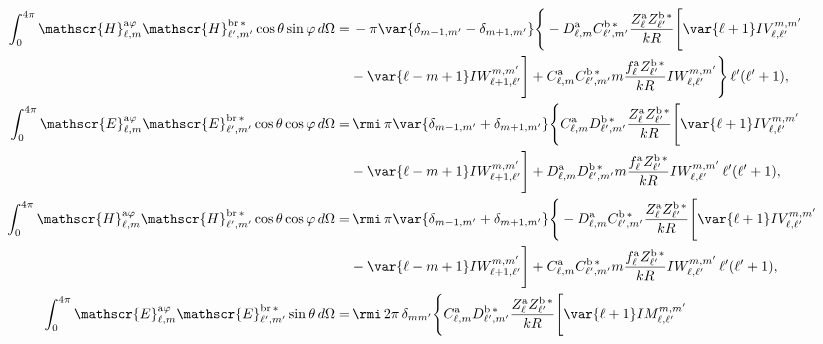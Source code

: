 \begin{align} 
\int_0^{4\pi}\mathscr{H}_{\ell, m}^{\text{a}\varphi}\mathscr{H}_{\ell^{\prime}, m^{\prime}}^{\text{br}\,*}\cos\theta\sin\varphi \, d\Omega
%
 =& \, - \pi \var{ \delta_{m-1, m^{\prime}} - \delta_{m+1, m^{\prime}} } \Bigg\{ -D_{\ell, m}^{\rm a} C_{\ell^{\prime}, m^{\prime}}^{\rm b \, *} \frac{Z_{\ell}^{\rm a} Z_{\ell^{\prime}}^{\rm b \, *}}{k R} \Bigg[\var{\ell +1} IV_{\ell, \ell^{\prime}}^{m, m^{\prime}} \nonumber \\ 
% 
&-\var{\ell - m +1} IW_{\ell + 1, \ell^{\prime}}^{m, m^{\prime}} \Bigg]
%
 + C_{\ell, m}^{\rm a} C_{\ell^{\prime}, m^{\prime}}^{\rm b \, *} m \frac{f_{\ell}^{\rm a} Z_{\ell^{\prime}}^{\rm b\, *}}{k R} IW_{\ell, \ell^{\prime}}^{m, m^{\prime}} \Bigg\} \, \ell^{\prime}(\ell^{\prime}+1),  \\
% 
%
%
%
\int_0^{4\pi}\mathscr{E}_{\ell, m}^{\text{a}\varphi}\mathscr{E}_{\ell^{\prime}, m^{\prime}}^{\text{br}\,*}\cos\theta\cos\varphi \, d\Omega
%
 =& \, \rmi \, \pi \var{ \delta_{m-1, m^{\prime}} + \delta_{m+1, m^{\prime}} } \Bigg\{ C_{\ell, m}^{\rm a} D_{\ell^{\prime}, m^{\prime}}^{\rm b \, *} \frac{Z_{\ell}^{\rm a} Z_{\ell^{\prime}}^{\rm b \, *}}{k R} \Bigg[\var{\ell +1} IV_{\ell, \ell^{\prime}}^{m, m^{\prime}} \nonumber \\ 
% 
&-\var{\ell - m +1} IW_{\ell + 1, \ell^{\prime}}^{m, m^{\prime}} \Bigg]
%
 + D_{\ell, m}^{\rm a} D_{\ell^{\prime}, m^{\prime}}^{\rm b \, *} m \frac{f_{\ell}^{\rm a} Z_{\ell^{\prime}}^{\rm b\, *}}{k R} IW_{\ell, \ell^{\prime}}^{m, m^{\prime}} \, \ell^{\prime}(\ell^{\prime}+1),\\
%
%
\int_0^{4\pi}\mathscr{H}_{\ell, m}^{\text{a}\varphi}\mathscr{H}_{\ell^{\prime}, m^{\prime}}^{\text{br}\,*}\cos\theta\cos\varphi \, d\Omega
%
 =& \, \rmi \, \pi \var{ \delta_{m-1, m^{\prime}} + \delta_{m+1, m^{\prime}} } \Bigg\{ -D_{\ell, m}^{\rm a} C_{\ell^{\prime}, m^{\prime}}^{\rm b \, *} \frac{Z_{\ell}^{\rm a} Z_{\ell^{\prime}}^{\rm b \, *}}{k R} \Bigg[\var{\ell +1} IV_{\ell, \ell^{\prime}}^{m, m^{\prime}} \nonumber \\ 
% 
&-\var{\ell - m +1} IW_{\ell + 1, \ell^{\prime}}^{m, m^{\prime}} \Bigg]
%
 + C_{\ell, m}^{\rm a} C_{\ell^{\prime}, m^{\prime}}^{\rm b \, *} m \frac{f_{\ell}^{\rm a} Z_{\ell^{\prime}}^{\rm b\, *}}{k R} IW_{\ell, \ell^{\prime}}^{m, m^{\prime}} \, \ell^{\prime}(\ell^{\prime}+1),\\
% 
%
%
%
\int_0^{4\pi}\mathscr{E}_{\ell, m}^{\text{a}\varphi}\mathscr{E}_{\ell^{\prime}, m^{\prime}}^{\text{br}\,*}\sin\theta \, d\Omega
%
 =& \, \rmi \, 2\pi \, \delta_{m m^{\prime}} \Bigg\{ C_{\ell, m}^{\rm a} D_{\ell^{\prime}, m^{\prime}}^{\rm b \, *} \frac{Z_{\ell}^{\rm a} Z_{\ell^{\prime}}^{\rm b \, *}}{k R} \Bigg[\var{\ell +1} IM_{\ell, \ell^{\prime}}^{m, m^{\prime}} \nonumber \\ 

\end{align}
